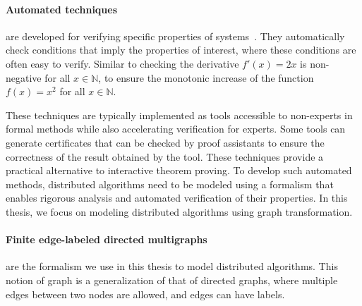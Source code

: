 \paragraph{Automated techniques} are developed for verifying specific properties of systems~\cite{contejean2011automated,giesl2014proving}. They automatically check conditions that imply the properties of interest, where these conditions are often easy to verify.
Similar to checking the derivative $f'(x) = 2x$ is non-negative for all $x \in \mathbb{N}$, to ensure the monotonic increase of the function $f(x) = x^2$ for all $x \in \mathbb{N}$.

These techniques are typically implemented as tools accessible to non-experts in formal methods while also accelerating verification for experts. Some tools can generate certificates that can be checked by proof assistants to ensure the correctness of the result obtained by the tool.
These techniques provide a practical alternative to interactive theorem proving. 
To develop such automated methods, distributed algorithms need to be modeled
using a formalism that enables rigorous analysis
and automated verification of their properties. 
In this thesis, we focus on modeling distributed algorithms using graph transformation.

\paragraph{Finite edge-labeled directed multigraphs} are the formalism we use in this thesis to model distributed algorithms. This notion of graph is a generalization of that of directed graphs, where multiple edges between two nodes are allowed, and edges can have labels. 

